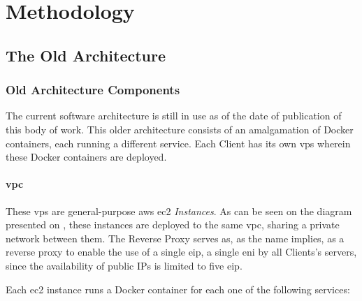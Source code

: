 \chapter{Methodology}\label{methodology}

\section{The Old Architecture}\label{methodology:s:the-old-architecture}

\subsection{Old Architecture Components }\label{methodology:ss:current-architecture}

The current software architecture is still in use as of the date of publication of this body of work. This older architecture consists of an amalgamation of Docker containers, each running a different service. Each Client has its own \gls{vps} wherein these Docker containers are deployed. 

\subsubsection{\gls{vpc}}\label{methodology:sss:vpc}

These \gls{vps} are general-purpose \gls{aws} \gls{ec2} \textit{Instances}. As can be seen on the diagram presented on , these instances are deployed to the same \gls{vpc}, sharing a private network between them. The Reverse Proxy serves as, as the name implies, as a reverse proxy to enable the use of a single \gls{eip}, a single \gls{eni} by all Clients's servers, since the availability of public IPs is limited to five \gls{eip}.



Each \gls{ec2} instance runs a Docker container for each one of the following services:

